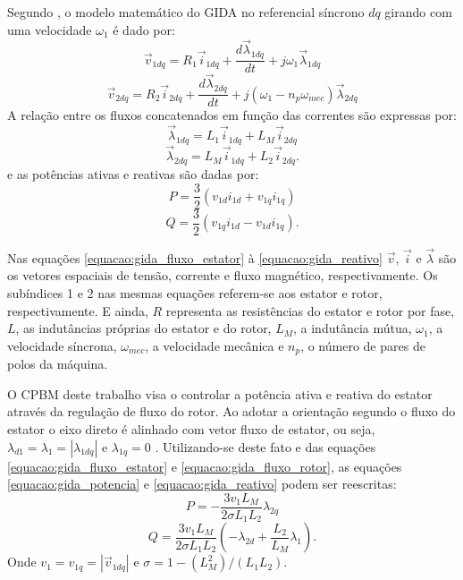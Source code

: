 	Segundo , o modelo matemático do GIDA no referencial síncrono $dq$ girando com uma velocidade $\omega_1$ é dado por: 
	\begin{equation} 
		\label{equacao:gida_ref_sinc_estator}
		\vec{v}_{1dq}=R_1\vec{i}_{1dq}+\frac{d\vec{\lambda}_{1dq}}{dt}+j\omega_1\vec{\lambda}_{1dq}
	\end{equation}
	\begin{equation}
		\label{equacao_gida_ref_sinc_rotor}
		\vec{v}_{2dq}=R_2\vec{i}_{2dq}+\frac{d\vec{\lambda}_{2dq}}{dt}+j(\omega_1-n_p{\omega_{mec}})\vec{\lambda}_{2dq}
	\end{equation}
	A relação entre os fluxos concatenados em função das correntes são expressas por:
	\begin{equation}
		\label{equacao:gida_fluxo_estator}
		\vec{\lambda}_{1dq}=L_1\vec{i}_{1dq}+L_M\vec{i}_{2dq}
	\end{equation}
	\begin{equation}
		\label{equacao:gida_fluxo_rotor}
		\vec{\lambda}_{2dq}=L_M\vec{i}_{1dq}+L_2\vec{i}_{2dq}.
	\end{equation}
	e as potências ativas e reativas são dadas por:
	\begin{equation}
		\label{equacao:gida_potencia}
		P=\frac{3}{2}(v_{1d}i_{1d}+v_{1q}i_{1q})
	\end{equation}
	\begin{equation}
		\label{equacao:gida_reativo}
		Q=\frac{3}{2}(v_{1q}i_{1d}-v_{1d}i_{1q}).
	\end{equation}
	
	Nas equações \ref{equacao:gida_fluxo_estator} à \ref{equacao:gida_reativo} $\vec{v}$, $\vec{i}$ e $\vec{\lambda}$ são os vetores espaciais de tensão, corrente e fluxo magnético, respectivamente. Os subíndices 1 e 2 nas mesmas equações referem-se aos estator e rotor, respectivamente. E ainda, $R$ representa as resistências do estator e rotor por fase, $L$, as indutâncias próprias do estator e do rotor, $L_M$, a indutância mútua, $\omega_1$, a velocidade síncrona, $\omega_{mec}$, a velocidade mecânica e $n_p$, o número de pares de polos da máquina.
	
	O CPBM deste trabalho visa o controlar a potência ativa e reativa do estator através da regulação de fluxo do rotor. Ao adotar a orientação segundo o fluxo do estator o eixo direto é alinhado com vetor fluxo de estator, ou seja, $\lambda_{d1}=\lambda_1=|\lambda_{1dq}|$ e $\lambda_{1q}=0$ \cite{paperalfeu}. Utilizando-se deste fato e das equações \ref{equacao:gida_fluxo_estator} e \ref{equacao:gida_fluxo_rotor}, as equações \ref{equacao:gida_potencia} e \ref{equacao:gida_reativo} podem ser reescritas:
	\begin{equation}
		\label{equacao:gida_potencia_desacoplamento}
		P=-\frac{3v_1L_M}{2\sigma L_1L_2}\lambda_{2q}
	\end{equation}
	\begin{equation}
		\label{equacao:gida_reativo_desacoplamento}
		Q=\frac{3v_1L_M}{2\sigma L_1L_2}(-\lambda_{2d}+\frac{L_2}{L_M}\lambda_1).
	\end{equation}
	Onde  $v_1=v_{1q}=|\vec{v}_{1dq}|$ e $\sigma=1-(L_M^2)/(L_1L_2)$.
	

